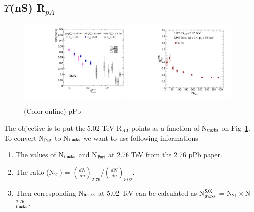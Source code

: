 \subsection{$\Upsilon$(nS) R$_{pA}$ }

\begin{figure}
  \begin{center}
\includegraphics[width=0.49\textwidth]{Figures/ExpOverview/Fig_trk_pPb.pdf}
\includegraphics[width=0.49\textwidth]{Figures/ExpOverview/Fig_CMS_Y1SRAANPart.pdf}
\caption{(Color online) pPb
}
\label{fig:UpsilonpPb}
\end{center}
\end{figure}


The objective is to put the 5.02 TeV R$_{AA}$ points as a function of N$_{\rm tracks}$ on Fig~\ref{fig:UpsilonpPb}. To convert
N$_{\rm Part}$ to N$_{\rm tracks}$ we want to use following informations

\begin{enumerate}
    \item The values of N$_{\rm tracks}$ and N$_{\rm Part}$ at 2.76 TeV from the 2.76 pPb paper.  
    \item The ratio (N$_{21}$) =  $(\frac{dN}{d\eta})_{2.76}$/$(\frac{dN}{d\eta})_{5.02}$. 
    \item Then corresponding N$_{\rm tracks}$ at 5.02 TeV can be calculated as N$_{\rm tracks}^{5.02}$ = N$_{21} \times $N$_{\rm tracks}^{2.76}$.  
\end{enumerate}
